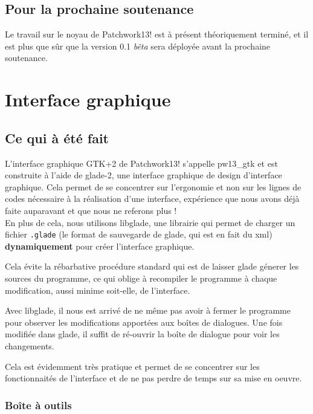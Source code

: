 \documentclass[14pt,a4paper]{report}
\begin{document}
\section{Pour la prochaine soutenance}

Le travail sur le noyau de Patchwork13! est \`a pr\'esent
th\'eoriquement termin\'e, et il est plus que s\^ur
que la version 0.1 {\it b\^eta} sera d\'eploy\'ee avant
la prochaine soutenance.
\\

\chapter{Interface graphique}

\section{Ce qui \`a \'et\'e fait}

L'interface graphique GTK+2 de Patchwork13! s'appelle pw13\_gtk et
est construite \`a l'aide de glade-2, une interface graphique de design
d'interface graphique. Cela permet de se concentrer sur l'ergonomie et
non sur les lignes de codes n\'ecessaire \`a la r\'ealisation d'une interface,
exp\'erience que nous avons d\'ej\`a faite auparavant et que nous ne
referons plus ! \\

En plus de cela, nous utilisons libglade, une librairie qui permet de
charger un fichier {\tt .glade} (le format de sauvegarde de glade,
qui est en fait du xml) {\bf dynamiquement} pour cr\'eer l'interface
graphique.

Cela \'evite la r\'ebarbative proc\'edure standard qui est de laisser glade
g\'enerer les sources du programme, ce qui oblige \`a recompiler le
programme \`a chaque modification, aussi minime soit-elle, de l'interface.

Avec libglade, il nous est arriv\'e de ne m\^eme pas avoir \`a fermer le
programme pour observer les modifications apport\'ees aux bo\^ites de
dialogues. Une fois modifi\'ee dans glade, il suffit de r\'e-ouvrir la
bo\^ite de dialogue pour voir les changements.

Cela est \'evidemment tr\`es pratique et permet de se concentrer sur les
fonctionnait\'es de l'interface et de ne pas perdre de temps sur sa mise
en oeuvre. \\

\newpage

\subsection{Bo\^ite \`a outils}
\end{document}
